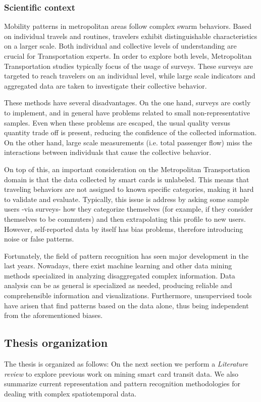 \documentclass{article}
\begin{document}
\subsubsection{Scientific context}
Mobility patterns in metropolitan areas follow complex swarm behaviors. Based on individual travels and routines, travelers exhibit distinguishable characteristics on a larger scale. Both individual and collective levels of understanding are crucial for Transportation experts. In order to explore both levels, Metropolitan Transportation studies typically focus of the usage of surveys. These surveys are targeted to reach travelers on an individual level, while large scale indicators and aggregated data are taken to investigate their collective behavior. 

These methods have several disadvantages. On the one hand, surveys are costly to implement, and in general have problems related to small non-representative samples. Even when these problems are escaped, the usual quality versus quantity trade off is present, reducing the confidence of the collected information. On the other hand, large scale measurements (i.e. total passenger flow) miss the interactions between individuals that cause the collective behavior.

On top of this, an important consideration on the Metropolitan Transportation domain is that the data collected by smart cards is unlabeled. This means that traveling behaviors are not assigned to known specific categories, making it hard to validate and evaluate. Typically, this issue is address by asking some sample users -via surveys- how they categorize themselves (for example, if they consider themselves to be commuters) and then extrapolating this profile to new users. However, self-reported data by itself has bias problems, therefore introducing noise or false patterns. 

Fortunately, the field of pattern recognition has seen major development in the last years. Nowadays, there exist machine learning and other data mining methods specialized in analyzing disaggregated complex information. Data analysis can be as general is specialized as needed, producing reliable and comprehensible information and visualizations. Furthermore, unsupervised tools have arisen that find patterns based on the data alone, thus being independent from the aforementioned biases.


\subsection{Thesis organization}
The thesis is organized as follows: On the next section we perform a \textit{Literature review} to explore previous work on mining smart card transit data. We also summarize current representation and pattern recognition methodologies for dealing with complex spatiotemporal data.  
\end{document}

